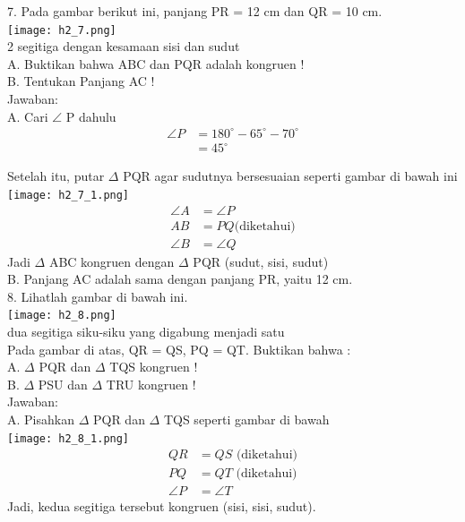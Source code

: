 \documentclass[11pt,fleqn]{book} %
\begin{document}
7. Pada gambar berikut ini, panjang PR = 12 cm dan QR = 10 cm.\\
\texttt{[image: h2\_7.png]}\\
2 segitiga dengan kesamaan sisi dan sudut\\

A. Buktikan bahwa  ABC dan  PQR adalah kongruen !\\
B. Tentukan Panjang AC !\\

Jawaban:\\
A. Cari $\angle$ P dahulu\\
    \begin{align*}              \angle P &= 180^{\circ} - 65^{\circ} - 70^{\circ} \\                      &= 45^{\circ}       \end{align*}

Setelah itu, putar $\Delta$ PQR agar sudutnya bersesuaian seperti gambar di bawah ini\\
\texttt{[image: h2\_7\_1.png]}\\
    \begin{align*}  	    \angle A &= \angle P \\  		AB &= PQ \text{(diketahui)} \\  		\angle B &= \angle Q   	  \end{align*}
Jadi $\Delta$ ABC kongruen dengan $\Delta$ PQR (sudut, sisi, sudut)\\

B. Panjang AC adalah sama dengan panjang PR, yaitu 12 cm.\\


8. Lihatlah gambar di bawah ini.\\
\texttt{[image: h2\_8.png]}\\
dua segitiga siku-siku yang digabung menjadi satu\\
Pada gambar di atas, QR = QS, PQ = QT. Buktikan bahwa :\\

A. $\Delta$ PQR dan $\Delta$ TQS kongruen !\\
B. $\Delta$ PSU dan $\Delta$ TRU kongruen !\\

Jawaban:\\
A. Pisahkan $\Delta$ PQR dan $\Delta$ TQS seperti gambar di bawah\\
\texttt{[image: h2\_8\_1.png]}\\
    \begin{align*}  	        QR &= QS \text{ (diketahui)}\\  		PQ &= QT \text{ (diketahui)} \\  		\angle P &= \angle T   	     \end{align*}
Jadi, kedua segitiga tersebut kongruen (sisi, sisi, sudut).\\
\end{document}
